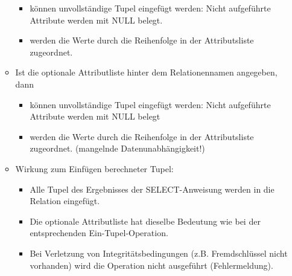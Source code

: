 \begin{remark}
\begin{itemize}
\begin{itemize}
                  \begin{itemize}
                      \item k\"onnen unvollständige Tupel eingef\"ugt werden: Nicht aufgef\"uhrte Attribute werden mit NULL belegt.
                      \item werden die Werte durch die Reihenfolge in der
                            Attributsliste zugeordnet.
                  \end{itemize}
            \item Ist die optionale Attributliste hinter dem Relationennamen
                  angegeben, dann\begin{itemize}
                      \item k\"onnen unvollst\"andige Tupel eingef\"ugt werden:
                            Nicht aufgef\"uhrte Attribute werden mit NULL belegt
                      \item werden die Werte durch die Reihenfolge in der
                            Attributsliste zugeordnet. (mangelnde Datenunabh\"angigkeit!)
                  \end{itemize}
            \item Wirkung zum Einf\"ugen berechneter Tupel:
                  \begin{itemize}
                      \item Alle Tupel des Ergebnisses der SELECT-Anweisung werden in die Relation eingef\"ugt.
                      \item Die optionale Attributliste hat dieselbe Bedeutung wie bei der entsprechenden Ein-Tupel-Operation.
                      \item Bei Verletzung von Integrit\"atsbedingungen (z.B. Fremdschl\"ussel nicht vorhanden) wird die Operation nicht ausgeführt (Fehlermeldung).
                  \end{itemize}
        \end{itemize}
    \end{itemize}
\end{remark}